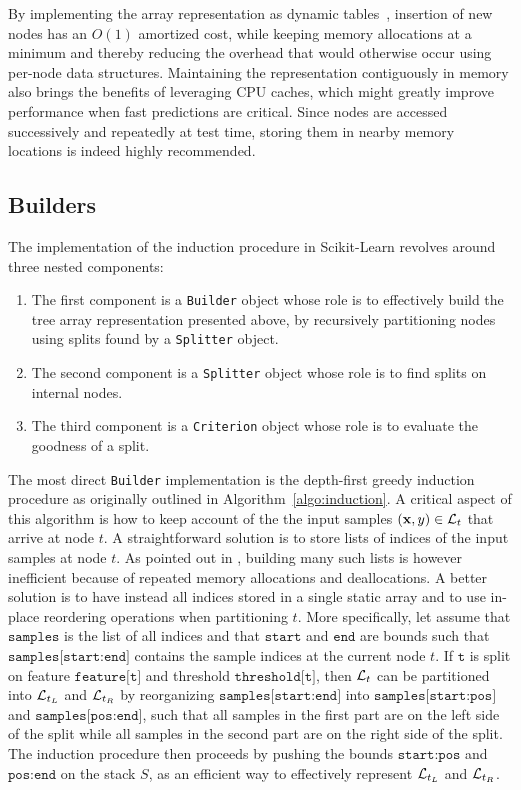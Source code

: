 By implementing the array representation as dynamic tables~\citep{cormen:2001},
insertion of new nodes has an $O(1)$ amortized cost, while keeping memory
allocations at a minimum and thereby reducing the overhead that would otherwise
occur using per-node data structures. Maintaining the representation
contiguously in memory also brings the benefits of leveraging CPU caches,
which might greatly improve performance when fast predictions are critical.
Since nodes are accessed successively and repeatedly at test time,
storing them in nearby memory locations is indeed highly recommended.

\subsection{Builders}

The implementation of the induction procedure in Scikit-Learn revolves around
three nested components:

\begin{enumerate}
\item The first component is a \texttt{Builder} object whose role is to
    effectively build the tree array representation presented above,
    by recursively partitioning nodes using splits found by a \texttt{Splitter} object.

\item The second component is a \texttt{Splitter} object whose role is to find splits on internal nodes.

\item The third component is a \texttt{Criterion} object whose role is to evaluate
    the goodness of a split.
\end{enumerate}

The most direct \texttt{Builder} implementation is the depth-first greedy
induction procedure as originally outlined in Algorithm~\ref{algo:induction}. A
critical aspect of this algorithm is how to keep account of the  the input
samples $(\mathbf{x},y) \in {\cal L}_t$  that arrive at node $t$. A
straightforward solution is to store lists of indices of the input samples at
node $t$. As pointed out in \citep{criminisi:2013}, building many such lists is
however inefficient because of repeated memory allocations and deallocations. A
better solution is to have instead all indices stored in a single static array
and to use in-place reordering operations when partitioning $t$. More
specifically, let assume that  $\texttt{samples}$ is the list of all indices
and that  $\texttt{start}$ and $\texttt{end}$ are bounds such that
$\texttt{samples[start:end]}$ contains the sample indices at the current node
$t$. If $\texttt{t}$ is split on feature $\texttt{feature[t]}$ and threshold
$\texttt{threshold[t]}$, then ${\cal L}_t$ can be partitioned into ${\cal
L}_{t_L}$ and ${\cal L}_{t_R}$ by reorganizing $\texttt{samples[start:end]}$
into $\texttt{samples[start:pos]}$ and $\texttt{samples[pos:end]}$, such that
all samples in the first part are on the left side of the split while all
samples in the second part are on the right side of the split. The induction
procedure then proceeds by pushing the bounds $\texttt{start:pos}$ and
$\texttt{pos:end}$ on the stack $S$, as an efficient way to effectively
represent ${\cal L}_{t_L}$ and ${\cal L}_{t_R}$.

